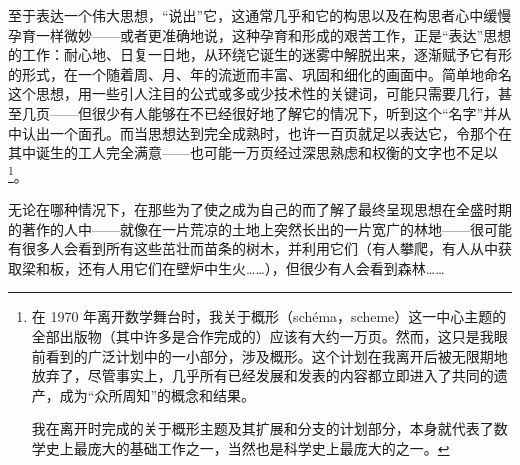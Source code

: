 至于表达一个伟大思想，“说出”它，这通常几乎和它的构思以及在构思者心中缓慢孕育一样微妙——或者更准确地说，这种孕育和形成的艰苦工作，正是“表达”思想的工作：耐心地、日复一日地，从环绕它诞生的迷雾中解脱出来，逐渐赋予它有形的形式，在一个随着周、月、年的流逝而丰富、巩固和细化的画面中。简单地命名这个思想，用一些引人注目的公式或多或少技术性的关键词，可能只需要几行，甚至几页——但很少有人能够在不已经很好地了解它的情况下，听到这个“名字”并从中认出一个面孔。而当思想达到完全成熟时，也许一百页就足以表达它，令那个在其中诞生的工人完全满意——也可能一万页经过深思熟虑和权衡的文字也不足以 \footnote{在 1970 年离开数学舞台时，我关于概形（schéma，scheme）这一中心主题的全部出版物（其中许多是合作完成的）应该有大约一万页。然而，这只是我眼前看到的广泛计划中的一小部分，涉及概形。这个计划在我离开后被无限期地放弃了，尽管事实上，几乎所有已经发展和发表的内容都立即进入了共同的遗产，成为“众所周知”的概念和结果。

我在离开时完成的关于概形主题及其扩展和分支的计划部分，本身就代表了数学史上最庞大的基础工作之一，当然也是科学史上最庞大的之一。}。

无论在哪种情况下，在那些为了使之成为自己的而了解了最终呈现思想在全盛时期的著作的人中——就像在一片荒凉的土地上突然长出的一片宽广的林地——很可能有很多人会看到所有这些茁壮而苗条的树木，并利用它们（有人攀爬，有人从中获取梁和板，还有人用它们在壁炉中生火……），但很少有人会看到森林……